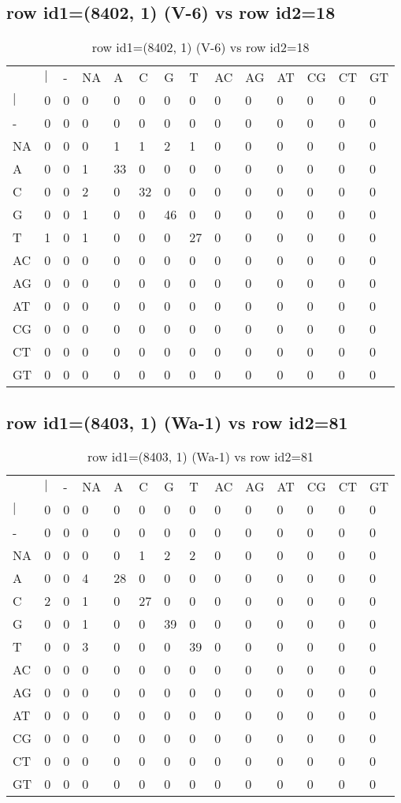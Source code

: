 \subsection{row id1=(8402, 1) (V-6) vs row id2=18}
\begin{center}
\begin{longtable}{|l|l|l|l|l|l|l|l|l|l|l|l|l|l|}
\caption{row id1=(8402, 1) (V-6) vs row id2=18} \label{table_dm464}\\
\hline
\\
\hline
&$|$&-&NA&A&C&G&T&AC&AG&AT&CG&CT&GT\\
$|$&0&0&0&0&0&0&0&0&0&0&0&0&0\\
-&0&0&0&0&0&0&0&0&0&0&0&0&0\\
NA&0&0&0&1&1&2&1&0&0&0&0&0&0\\
A&0&0&1&33&0&0&0&0&0&0&0&0&0\\
C&0&0&2&0&32&0&0&0&0&0&0&0&0\\
G&0&0&1&0&0&46&0&0&0&0&0&0&0\\
T&1&0&1&0&0&0&27&0&0&0&0&0&0\\
AC&0&0&0&0&0&0&0&0&0&0&0&0&0\\
AG&0&0&0&0&0&0&0&0&0&0&0&0&0\\
AT&0&0&0&0&0&0&0&0&0&0&0&0&0\\
CG&0&0&0&0&0&0&0&0&0&0&0&0&0\\
CT&0&0&0&0&0&0&0&0&0&0&0&0&0\\
GT&0&0&0&0&0&0&0&0&0&0&0&0&0\\
\hline
\end{longtable}
\end{center}

\subsection{row id1=(8403, 1) (Wa-1) vs row id2=81}
\begin{center}
\begin{longtable}{|l|l|l|l|l|l|l|l|l|l|l|l|l|l|}
\caption{row id1=(8403, 1) (Wa-1) vs row id2=81} \label{table_dm466}\\
\hline
\\
\hline
&$|$&-&NA&A&C&G&T&AC&AG&AT&CG&CT&GT\\
$|$&0&0&0&0&0&0&0&0&0&0&0&0&0\\
-&0&0&0&0&0&0&0&0&0&0&0&0&0\\
NA&0&0&0&0&1&2&2&0&0&0&0&0&0\\
A&0&0&4&28&0&0&0&0&0&0&0&0&0\\
C&2&0&1&0&27&0&0&0&0&0&0&0&0\\
G&0&0&1&0&0&39&0&0&0&0&0&0&0\\
T&0&0&3&0&0&0&39&0&0&0&0&0&0\\
AC&0&0&0&0&0&0&0&0&0&0&0&0&0\\
AG&0&0&0&0&0&0&0&0&0&0&0&0&0\\
AT&0&0&0&0&0&0&0&0&0&0&0&0&0\\
CG&0&0&0&0&0&0&0&0&0&0&0&0&0\\
CT&0&0&0&0&0&0&0&0&0&0&0&0&0\\
GT&0&0&0&0&0&0&0&0&0&0&0&0&0\\
\hline
\end{longtable}
\end{center}

